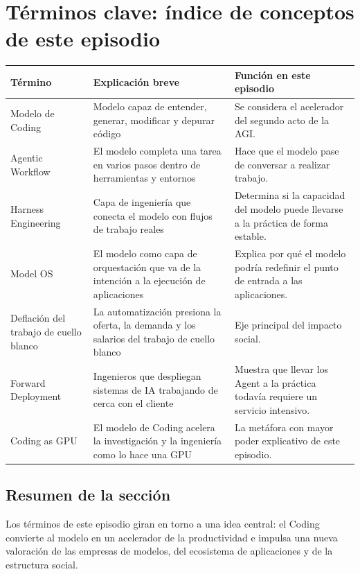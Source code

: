 \section{Términos clave: índice de conceptos de este episodio}

\begin{longtable}{p{}p{}p{}}
\toprule
Término & Explicación breve & Función en este episodio \\
\midrule
Modelo de Coding & Modelo capaz de entender, generar, modificar y depurar código & Se considera el acelerador del segundo acto de la AGI. \\
Agentic Workflow & El modelo completa una tarea en varios pasos dentro de herramientas y entornos & Hace que el modelo pase de conversar a realizar trabajo. \\
Harness Engineering & Capa de ingeniería que conecta el modelo con flujos de trabajo reales & Determina si la capacidad del modelo puede llevarse a la práctica de forma estable. \\
Model OS & El modelo como capa de orquestación que va de la intención a la ejecución de aplicaciones & Explica por qué el modelo podría redefinir el punto de entrada a las aplicaciones. \\
Deflación del trabajo de cuello blanco & La automatización presiona la oferta, la demanda y los salarios del trabajo de cuello blanco & Eje principal del impacto social. \\
Forward Deployment & Ingenieros que despliegan sistemas de IA trabajando de cerca con el cliente & Muestra que llevar los Agent a la práctica todavía requiere un servicio intensivo. \\
Coding as GPU & El modelo de Coding acelera la investigación y la ingeniería como lo hace una GPU & La metáfora con mayor poder explicativo de este episodio. \\
\bottomrule
\end{longtable}

\subsection{Resumen de la sección}

Los términos de este episodio giran en torno a una idea central: el Coding convierte al modelo en un acelerador de la productividad e impulsa una nueva valoración de las empresas de modelos, del ecosistema de aplicaciones y de la estructura social.
